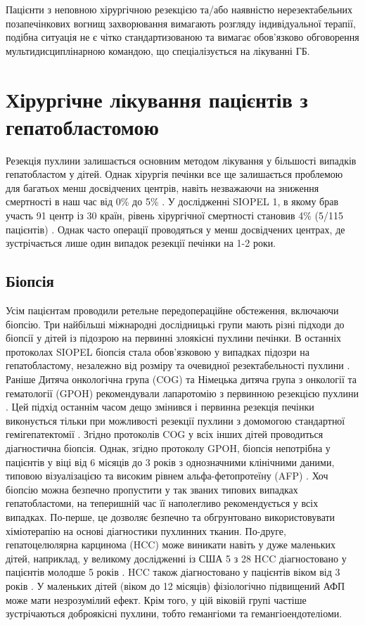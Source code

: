 Пацієнти з неповною хірургічною резекцією та/або наявністю нерезектабельних позапечінкових вогнищ захворювання вимагають розгляду індивідуальної терапії, подібна ситуація не є чітко стандартизованою та вимагає обов'язково обговорення мультидисциплінарною командою, що спеціалізується на лікуванні ГБ\cite{pmid28347528}. 

\section{Хірургічне лікування пацієнтів з гепатобластомою}
Резекція пухлини залишається основним методом лікування у більшості випадків гепатобластом у дітей. Однак хірургія печінки все ще залишається проблемою для багатьох менш досвідчених центрів, навіть незважаючи на зниження смертності в наш час від 0\% до 5\% \cite{pmid25649007}. У дослідженні SIOPEL 1, в якому брав участь 91 центр із 30 країн, рівень хірургічної смертності становив 4\% (5/115 пацієнтів) \cite{pmid25783395}. Однак часто операції проводяться у менш досвідчених центрах, де зустрічається лише один випадок резекції печінки на 1-2 роки.
\subsection{Біопсія}
Усім пацієнтам проводили ретельне передопераційне обстеження, включаючи біопсію. Три найбільші міжнародні дослідницькі групи мають різні підходи до біопсії у дітей із підозрою на первинні злоякісні пухлини печінки. В останніх протоколах SIOPEL біопсія стала обов’язковою у випадках підозри на гепатобластому, незалежно від розміру та очевидної резектабельності пухлини \cite{pmid25945430}. Раніше Дитяча онкологічна група (COG) та Німецька дитяча група з онкології та гематології (GPOH) рекомендували лапаротомію з первинною резекцією пухлини \cite{pmid26106955}. Цей підхід останнім часом дещо змінився і первинна резекція печінки виконується тільки  при можливості резекції пухлини з домомогою стандартної гемігепатектомії \cite{pmid26835349}. Згідно протоколів COG у всіх інших дітей проводиться діагностична біопсія. Однак, згідно протоколу GPOH, біопсія непотрібна у пацієнтів у віці від 6 місяців до 3 років з однозначними клінічними даними, типовою візуалізацією та високим рівнем альфа-фетопротеїну (AFP) \cite{pmid26945966}. Хоч біопсію можна безпечно пропустити у так званих типових випадках гепатобластоми, на теперишній час її наполегливо рекомендується у всіх випадках. По-перше, це дозволяє безпечно та обгрунтовано використовувати хіміотерапію на основі діагностики пухлинних тканин. По-друге, гепатоцелюлярна карцинома (HCC) може виникати навіть у дуже маленьких дітей, наприклад, у великому дослідженні із США 5 з 28 HCC діагностовано у пацієнтів молодше 5 років \cite{pmid26945966}. HCC також діагностовано у пацієнтів віком від 3 років \cite{pmid27501172}. У маленьких дітей (віком до 12 місяців) фізіологічно підвищений АФП може мати незрозумілий ефект. Крім того, у цій віковій групі частіше зустрічаються доброякісні пухлини, тобто гемангіоми та гемангіоендотеліоми.

